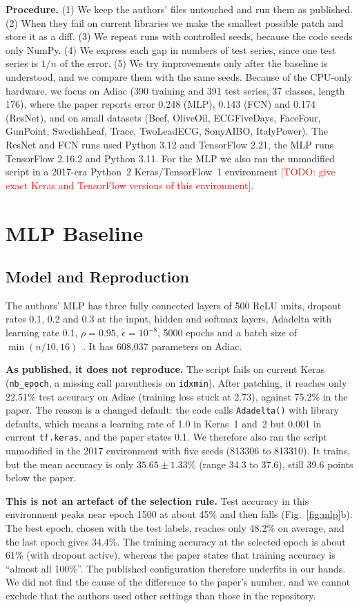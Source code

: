 \documentclass[conference]{IEEEtran}
\newcommand{\todo}[1]{\textcolor{red}{[TODO: #1]}}
\begin{document}
\textbf{Procedure.} (1) We keep the authors' files untouched and run them as published. (2) When they fail on current libraries we make the smallest possible patch and store it as a diff. (3) We repeat runs with controlled seeds, because the code seeds only NumPy. (4) We express each gap in numbers of test series, since one test series is $1/n$ of the error. (5) We try improvements only after the baseline is understood, and we compare them with the same seeds. Because of the CPU-only hardware, we focus on Adiac (390 training and 391 test series, 37 classes, length 176), where the paper reports error 0.248 (MLP), 0.143 (FCN) and 0.174 (ResNet), and on small datasets (Beef, OliveOil, ECGFiveDays, FaceFour, GunPoint, SwedishLeaf, Trace, TwoLeadECG, SonyAIBO, ItalyPower). The ResNet and FCN runs used Python 3.12 and TensorFlow 2.21, the MLP runs TensorFlow 2.16.2 and Python 3.11. For the MLP we also ran the unmodified script in a 2017-era Python~2 Keras/TensorFlow~1 environment \todo{give exact Keras and TensorFlow versions of this environment}.

\section{MLP Baseline}
\subsection{Model and Reproduction}
The authors' MLP has three fully connected layers of 500 ReLU units, dropout rates 0.1, 0.2 and 0.3 at the input, hidden and softmax layers, Adadelta with learning rate 0.1, $\rho=0.95$, $\epsilon=10^{-8}$, 5000 epochs and a batch size of $\min(n/10,16)$~\cite{wang2016}. It has 608,037 parameters on Adiac.

\textbf{As published, it does not reproduce.} The script fails on current Keras (\texttt{nb\_epoch}, a missing call parenthesis on \texttt{idxmin}). After patching, it reaches only 22.51\% test accuracy on Adiac (training loss stuck at 2.73), against 75.2\% in the paper. The reason is a changed default: the code calls \texttt{Adadelta()} with library defaults, which means a learning rate of 1.0 in Keras~1 and~2 but 0.001 in current \texttt{tf.keras}, and the paper states 0.1. We therefore also ran the script unmodified in the 2017 environment with five seeds (813306 to 813310). It trains, but the mean accuracy is only $35.65\pm1.33$\% (range 34.3 to 37.6), still 39.6 points below the paper.

\textbf{This is not an artefact of the selection rule.} Test accuracy in this environment peaks near epoch 1500 at about 45\% and then falls (Fig.~\ref{fig:mlp}b). The best epoch, chosen with the test labels, reaches only 48.2\% on average, and the last epoch gives 34.4\%. The training accuracy at the selected epoch is about 61\% (with dropout active), whereas the paper states that training accuracy is ``almost all 100\%''. The published configuration therefore underfits in our hands. We did not find the cause of the difference to the paper's number, and we cannot exclude that the authors used other settings than those in the repository.
\end{document}
